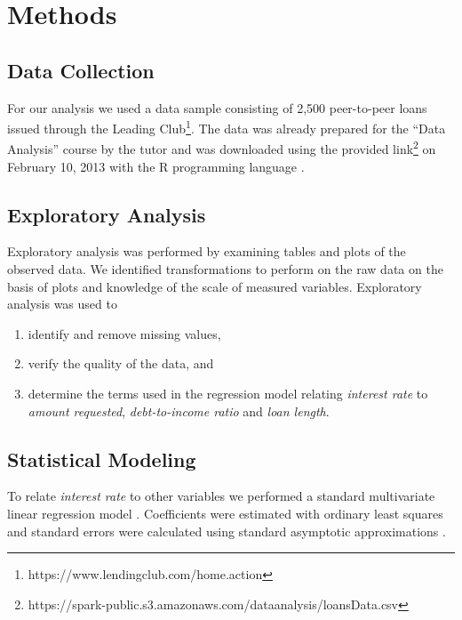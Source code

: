 \documentclass[a4paper,12pt]{extarticle}
\begin{document}

\section{Methods}

\subsection{Data Collection}

For our analysis we used a data sample consisting of 2,500 peer-to-peer loans issued through the Leading Club\footnote{https://www.lendingclub.com/home.action}. The data was already prepared for the ``Data Analysis'' course by the tutor and was downloaded using the provided link\footnote{https://spark-public.s3.amazonaws.com/dataanalysis/loansData.csv} on February 10, 2013 with the R programming language \cite{source:r-language}.

\subsection{Exploratory Analysis}

Exploratory analysis was performed by examining tables and plots of the observed data. We identified transformations to perform on the raw data on the basis of plots and knowledge of the scale of measured variables. Exploratory analysis was used to

\begin{enumerate}
  \item identify and remove missing values,
  \item verify the quality of the data, and
  \item determine the terms used in the regression model relating \emph{interest rate} to \emph{amount requested}, \emph{debt-to-income ratio} and \emph{loan length}.
\end{enumerate}

\subsection{Statistical Modeling}

To relate \emph{interest rate} to other variables we performed a standard multivariate linear regression model \cite{source:book-linear.regression}. Coefficients were estimated with ordinary least squares and standard errors were calculated using standard asymptotic approximations \cite{source:book-some.shit}.
\end{document}
